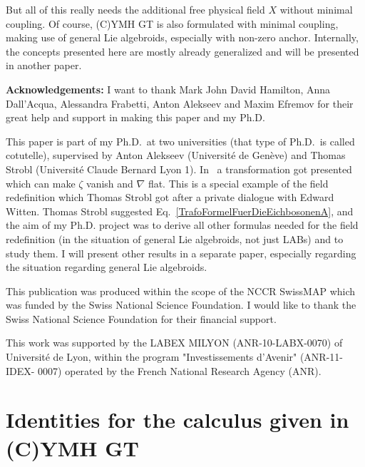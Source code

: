 \documentclass[preprint]{elsarticle}
\renewcommand{\theequation}{\arabic{equation}}
\renewcommand{\listoffigures}{\begingroup
\tocsection
\tocfile{\listfigurename}{lof}
\endgroup}
\renewcommand{\listoftables}{\begingroup
\tocsection
\tocfile{\listtablename}{lot}
\endgroup}
\theoremstyle{plain}
\theoremstyle{remark}
\theoremstyle{definition}
\begin{document}
But all of this really needs the additional free physical field $X$ without minimal coupling. Of course, (C)YMH GT is also formulated with minimal coupling, making use of general Lie algebroids, especially with non-zero anchor. Internally, the concepts presented here are mostly already generalized and will be presented in another paper.

\textbf{Acknowledgements:} I want to thank Mark John David Hamilton, Anna Dall'Acqua, Alessandra Frabetti, Anton Alekseev and Maxim Efremov for their great help and support in making this paper and my Ph.D. 

This paper is part of my Ph.D.~at two universities (that type of Ph.D.~is called cotutelle), supervised by Anton Alekseev (Universit\'{e} de Gen\`eve) and Thomas Strobl (Universit\'{e} Claude Bernard Lyon 1). In~\cite[the example at the very end before the conclusion; the $B$ there is the $\zeta$ presented here]{CurvedYMH} a transformation got presented which can make $\zeta$ vanish and $\nabla$ flat. This is a special example of the field redefinition which Thomas Strobl got after a private dialogue with Edward Witten. Thomas Strobl suggested Eq.~\eqref{TrafoFormelFuerDieEichbosonenA}, and the aim of my Ph.D. project was to derive all other formulas needed for the field redefinition (in the situation of general Lie algebroids, not just LABs) and to study them. I will present other results in a separate paper, especially regarding the situation regarding general Lie algebroids.

This publication was produced within the scope of the NCCR SwissMAP which was funded by the Swiss National Science Foundation. I would like to thank the Swiss National Science Foundation for their financial support.

This work was supported by the LABEX MILYON (ANR-10-LABX-0070) of Universit\'{e} de Lyon, within the program "Investissements d'Avenir" (ANR-11-IDEX- 0007) operated by the French National Research Agency (ANR).


\newpage




\appendix
\setcounter{equation}{0}
\renewcommand{\theequation}{\Alph{section}.\arabic{equation}} %
\section{Identities for the calculus given in (C)YMH GT}\label{CalculusIdentitiesNeeded}
\end{document}
